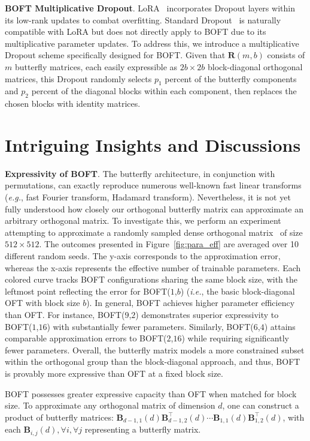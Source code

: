\textbf{BOFT Multiplicative Dropout}. LoRA~\cite{hulora2022} incorporates Dropout layers within its low-rank updates to combat overfitting. Standard Dropout~\cite{srivastava2014dropout} is naturally compatible with LoRA but does not directly apply to BOFT due to its multiplicative parameter updates. To address this, we introduce a multiplicative Dropout scheme specifically designed for BOFT. Given that $\bm{R}(m,b)$ consists of $m$ butterfly matrices, each easily expressible as $2b\times 2b$ block-diagonal orthogonal matrices, this Dropout randomly selects $p_1$ percent of the butterfly components and $p_2$ percent of the diagonal blocks within each component, then replaces the chosen blocks with identity matrices.

\section{Intriguing Insights and Discussions}

\textbf{Expressivity of BOFT}. The butterfly architecture, in conjunction with permutations, can exactly reproduce numerous well-known fast linear transforms~\cite{dao2019learning,dao2019kaleidoscope} (\emph{e.g.}, fast Fourier transform, Hadamard transform). Nevertheless, it is not yet fully understood how closely our orthogonal butterfly matrix can approximate an arbitrary orthogonal matrix. To investigate this, we perform an experiment attempting to approximate a randomly sampled dense orthogonal matrix~\cite{anderson1987generation} of size $512\times 512$. The outcomes presented in Figure~\ref{fig:para_eff} are averaged over 10 different random seeds. The y-axis corresponds to the approximation error, whereas the x-axis represents the effective number of trainable parameters. Each colored curve tracks BOFT configurations sharing the same block size, with the leftmost point reflecting the error for BOFT($1$,$b$) (\emph{i.e.}, the basic block-diagonal OFT with block size $b$). In general, BOFT achieves higher parameter efficiency than OFT. For instance, BOFT($9$,$2$) demonstrates superior expressivity to BOFT($1$,$16$) with substantially fewer parameters. Similarly, BOFT($6$,$4$) attains comparable approximation errors to BOFT($2$,$16$) while requiring significantly fewer parameters. Overall, the butterfly matrix models a more constrained subset within the orthogonal group than the block-diagonal approach, and thus, BOFT is provably more expressive than OFT at a fixed block size.

\begin{theorem}\label{thm:exp_boft}
    BOFT possesses greater expressive capacity than OFT when matched for block size. To approximate any orthogonal matrix of dimension $d$, one can construct a product of butterfly matrices:  $\bm{B}_{d-1,1}(d)\bm{B}^\top_{d-1,2}(d)\cdots\bm{B}_{1,1}(d)\bm{B}^\top_{1,2}(d)$, with each $\bm{B}_{i,j}(d),\forall i,\forall j$ representing a butterfly matrix.
\end{theorem}

